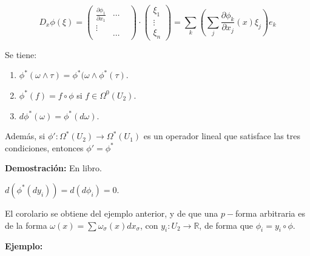 \begin{equation}
  D_x \phi(\xi) = \left( \begin{array}{ccc}
                          \frac{\partial \phi_1}{\partial x_1} & \cdots &  \\
                          \vdots &  &  \\
                                                               & \cdots &  \end{array} \right) \cdot
                   \left( \begin{array}{c}
                           \xi_1  \\
                           \vdots  \\
                           \xi_n  \end{array} \right) = \sum_k(\sum_j \frac{\partial \phi_k}{\partial x_j}(x)\xi_j)e_k
\end{equation}


\begin{Teo}
  \label{teo5}
  Se tiene:

  \begin{enumerate}
  \item $\phi^*(\omega \wedge \tau)=\phi^*(\omega \wedge \phi^*(\tau)$.
  \item $\phi^*(f)=f\circ \phi$ si $f\in  \Omega^0(U_2)$.
  \item $d\phi^*(\omega) = \phi^*(d\omega)$. 
  \end{enumerate}
  Además, si $\phi':\Omega^*(U_2)\rightarrow \Omega^*(U_1)$ es un operador lineal que satisface las tres condiciones, entonces $\phi'=\phi^*$
\end{Teo}

\textbf{Demostración:} En libro. 


\begin{Cor}
$d(\phi^*(dy_i))=d(d\phi_i)=0$.
\end{Cor}

\begin{nota}
El corolario se obtiene del ejemplo anterior, y de que una $p-$forma arbitraria es de la forma $\omega (x) = \sum \omega_\sigma (x) dx_\sigma $, con $y_i:U_2\rightarrow \mathbb{R}$, de forma que $\phi_i=y_i\circ \phi$. 
\end{nota}

\textbf{Ejemplo:}

